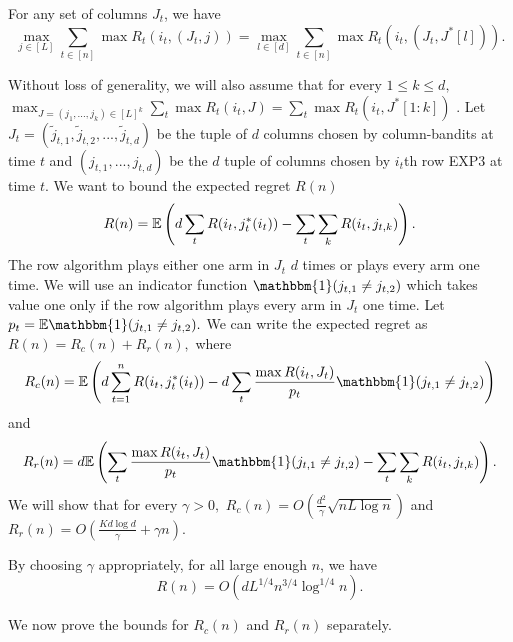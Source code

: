 \begin{lemma}
\label{thm:hott}
For any set of columns $J_t$, we have 
$$ \max_{j \in [L]} \sum_{t \in [n]} \max R_t(i_t, (J_t,j)) = \max_{l \in [d]} \sum_{t \in [n]} \max R_t(i_t, (J_t,J^*[l])).$$
\end{lemma}
Without loss of generality, we will also assume that for every $1 \leq k \leq d,$ $\max_{J = (j_1,...,j_k) \in [L]^k} \sum_t \max R_t(i_t,J) = \sum_t \max R_t(i_t,J^*[1:k])$ .  Let $J_t = (\tilde{j}_{t,1},\tilde{j}_{t,2},...,\tilde{j}_{t,d})$ be the tuple of $d$ columns chosen by column-bandits at time $t$ and $(j_{t,1},...,j_{t,d})$ be the $d$ tuple of columns chosen by $i_t$th row EXP3 at time $t.$ We want to bound the expected regret $R(n)$  
$$R(n) = \mathbb{E} \left( d\sum_{t } R(i_t,j^*_t(i_t)) - \sum_{t} \sum_k R(i_t,j_{t,k}) \right).$$
 The row algorithm plays either one arm in $J_t$ $d$ times or plays every arm one time. We will use an indicator function $\mathbbm{1}(j_{t,1} \neq j_{t,2})$ which takes value one only if the row algorithm  plays every arm in $J_t$ one time. Let $p_t = \E \mathbbm{1}(j_{t,1} \neq j_{t,2}).$  We can write the expected regret as 
$R(n) = R_c(n) + R_r(n),$ where
$$R_c(n) = \E \left( d\sum_{t = 1}^{n} R(i_t,j^*_t(i_t)) - d\sum_{t} \frac{\max R(i_t,J_t)}{p_t} \mathbbm{1}(j_{t,1} \neq j_{t,2})  \right) $$
and
$$R_r(n) = d \E \left( \sum_{t} \frac{ \max R(i_t,J_t)}{p_t} \mathbbm{1}(j_{t,1} \neq j_{t,2}) - \sum_{t} \sum_k R(i_t,j_{t,k}) \right) .$$
We will show that for every $\gamma > 0,$   
$R_c(n) =  O \left( \frac{d^2}{\gamma} \sqrt {n L \log n} \right)$
and $R_r(n) =O \left( \frac{K d\log d}{\gamma} + \gamma n  \right) .$ 
\begin{theorem}
By choosing $\gamma$ appropriately, for all large enough $n$, we have 
$$R(n) = O\left( d L^{1/4} n^{3/4} \log^{1/4} n\right) .$$
\end{theorem}
We now prove the bounds for $R_c(n)$ and $R_r(n)$ separately. 




